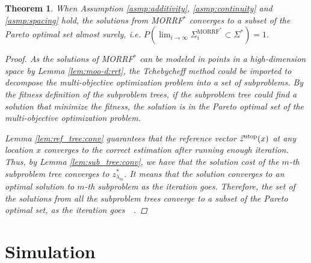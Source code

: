 \documentclass{article}
\newtheorem{thm}{Theorem}
\begin{document}
\begin{thm}
\label{thm:morrt:conv}
When Assumption \ref{asmp:additivity}, \ref{asmp:continuity} and \ref{asmp:spacing} hold,
the solutions from MORRF$^{*} $ converges to a subset of the Pareto optimal set almost surely, i.e.
$
P( \lim_{ i \rightarrow \infty }  \Sigma^{\mbox{MORRF}^{*}}_{i}  \subset \Sigma^{*} ) = 1.
$
\begin{proof}
As the solutions of MORRF$^{*}$ can be modeled in points in a high-dimension space by Lemma \ref{lem:moo-d:rrt}, the Tchebycheff method could be imported to decompose the multi-objective optimization problem into a set of subproblems.
By the fitness definition of the subproblem trees, if the subproblem tree could find a solution that minimize the fitness, the solution is in the Pareto optimal set of the multi-objective optimization problem.

Lemma \ref{lem:ref_tree:conv} guarantees that the reference vector $ \vec{z}^{\rm utop}(x) $ at any location $ x $ converges to the correct estimation after running enough iteration.
Thus, by Lemma \ref{lem:sub_tree:conv}, we have that the solution cost of the $ m $-th subproblem tree converges to $ z^{*}_{ \lambda_{m} } $.
It means that the solution converges to an optimal solution to $ m $-th subproblem as the iteration goes.
Therefore, the set of the solutions from all the subproblem trees converge to a subset of the Pareto optimal set, as the iteration goes~\cite{4358754}~\cite{miettinen1999nonlinear}.
\end{proof}
\end{thm}

\section{Simulation}
\label{sec:simulation}

\end{document}
